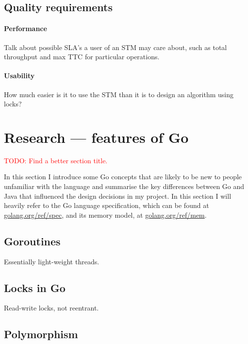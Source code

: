 \documentclass[12pt,a4paper,oneside,openright]{report}
\newcommand{\todo}[1]{\textcolor{red}{TODO: #1}}
\begin{document}
\subsection{Quality requirements}
\label{sec:prep:usab-requ}

\paragraph{Performance} Talk about possible SLA's a user of an STM may
care about, such as total throughput and max TTC for particular
operations.

\paragraph{Usability} How much easier is it to use the STM than it is
to design an algorithm using locks?

\section{Research --- features of Go}
\label{sec:prep:research}
\todo{Find a better section title.}

In this section I introduce some Go concepts that are likely to be new
to people unfamiliar with the language and summarise the key
differences between Go and Java that influenced the design decisions
in my project. In this section I will heavily refer to the Go language
specification, which can be found at
\href{https://golang.org/ref/spec}{golang.org/ref/spec}, and its
memory model, at
\href{https://golang.org/ref/mem}{golang.org/ref/mem}.

\subsection{Goroutines}
\label{sec:prep:goroutines}

Essentially light-weight threads.

\subsection{Locks in Go}
\label{sec:prep:locks-go}

Read-write locks, not reentrant.

\subsection{Polymorphism}
\label{sec:prep:polymorphism}
\end{document}
